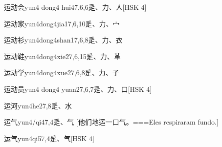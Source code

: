 \begin{EntryWithPhonetic}{运动会}{yun4 dong4 hui4}{7,6,6}{⾡、⼒、⼈}[HSK 4]
\end{EntryWithPhonetic}

\begin{EntryWithPhonetic}{运动家}{yun4dong4jia1}{7,6,10}{⾡、⼒、⼧}
\end{EntryWithPhonetic}

\begin{EntryWithPhonetic}{运动衫}{yun4dong4shan1}{7,6,8}{⾡、⼒、⾐}
\end{EntryWithPhonetic}

\begin{EntryWithPhonetic}{运动鞋}{yun4dong4xie2}{7,6,15}{⾡、⼒、⾰}
\end{EntryWithPhonetic}

\begin{EntryWithPhonetic}{运动学}{yun4dong4xue2}{7,6,8}{⾡、⼒、⼦}
\end{EntryWithPhonetic}

\begin{EntryWithPhonetic}{运动员}{yun4 dong4 yuan2}{7,6,7}{⾡、⼒、⼝}[HSK 4]
\end{EntryWithPhonetic}

\begin{EntryWithPhonetic}{运河}{yun4he2}{7,8}{⾡、⽔}
\end{EntryWithPhonetic}

\begin{EntryWithPhonetic}{运气}{yun4/qi4}{7,4}{⾡、⽓}
  [他们地运一口气。===Eles respiraram fundo.]
\end{EntryWithPhonetic}

\begin{EntryWithPhonetic}{运气}{yun4qi5}{7,4}{⾡、⽓}[HSK 4]
\end{EntryWithPhonetic}

